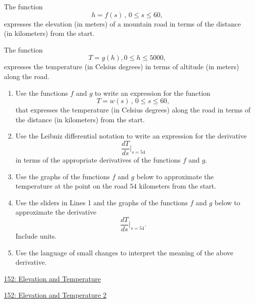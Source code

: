 \documentclass{ximera}
\begin{document}
\begin{question}  \label{Q9erKKe333}
The function
\[
   h = f(s) \, , \, 0\leq s \leq 60 ,
\]
expresses the elevation (in meters) of a mountain road in terms of the distance (in kilometers) from the start.

The function 
\[
    T = g(h) , 0\leq h \leq 5000 ,
\] 
expresses the temperature (in Celsius degrees) in terms of altitude (in meters) along the road.

\begin{enumerate}
\item Use the functions $f$ and $g$ to write an expression for the function
\[
 T = w(s) \, , \, 0\leq s \leq 60 ,
\]
that expresses the temperature (in Celsius degrees) along the road in terms of the distance (in kilometers) from the start.

\item Use the Leibniz differential notation to write an expression for the derivative
\[
  \frac{dT}{ds}\Big|_{s=54}
\]
in terms of the appropriate derivatives of the functions $f$ and $g$.

\item Use the graphs of the functions $f$ and $g$ below to approximate the temperature at the point on the road $54$ kilometers from the start.

\item Use the sliders in Lines 1 and the graphs of the functions $f$ and $g$ below to approximate the derivative
\[
   \frac{dT}{ds}\Big|_{s=54} .
\]
Include units.

\item Use the language of small changes to interpret the meaning of the above derivative.
\end{enumerate}

\begin{onlineOnly}
    \begin{center}
\end{center}
\end{onlineOnly}

\href{https://www.desmos.com/calculator/gcmfa2a6jz}{152: Elevation and Temperature}

\begin{onlineOnly}
    \begin{center}
\end{center}
\end{onlineOnly}

\href{https://www.desmos.com/calculator/ohqk3ak539}{152: Elevation and Temperature 2}
\end{question}
\end{document}
